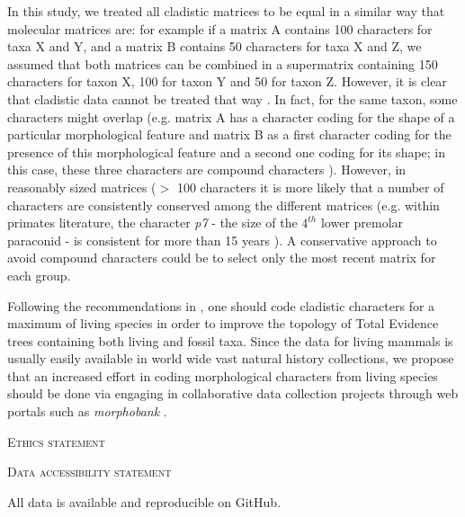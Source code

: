 \documentclass[12pt,letterpaper]{article}
\renewcommand{\section}[1]{%
\bigskip
\begin{center}
\begin{Large}
\normalfont\scshape #1
\medskip
\end{Large}
\end{center}}
\begin{document}
In this study, we treated all cladistic matrices to be equal in a similar way that molecular matrices are: for example if a matrix A contains 100 characters for taxa X and Y, and a matrix B contains 50 characters for taxa X and Z, we assumed that both matrices can be combined in a supermatrix containing 150 characters for taxon X, 100 for taxon Y and 50 for taxon Z.
However, it is clear that cladistic data cannot be treated that way \citep{Brazeau2011}.
In fact, for the same taxon, some characters might overlap (e.g. matrix A has a character coding for the shape of a particular morphological feature and matrix B as a first character coding for the presence of this morphological feature and a second one coding for its shape; in this case, these three characters are compound characters \citep{Brazeau2011}).
However, in reasonably sized matrices ($>$ 100 characters \citep{GuillermeCooper,harrisonamong-character2014} it is more likely that a number of characters are consistently conserved among the different matrices (e.g. within primates literature, the character \textit{p7} - the size of the $4^{th}$ lower premolar paraconid - is consistent for more than 15 years \citep{ross1998phylogenetic,seiffert2003fossil,marivaux2005anthropoid,seiffert2005basal,bloch2007new,kay2008anatomy,silcox2008biogeographic,seiffert2009convergent,tabuce2009anthropoid,boyer2010astragalar,seiffert2010fossil,marivaux2013djebelemur,ni2013oldest}).
A conservative approach to avoid compound characters could be to select only the most recent matrix for each group.

Following the recommendations in \citep{GuillermeCooper}, one should code cladistic characters for a maximum of living species in order to improve the topology of Total Evidence trees containing both living and fossil taxa.
Since the data for living mammals is usually easily available in world wide vast natural history collections, we propose that an increased effort in coding morphological characters from living species should be done via engaging in collaborative data collection projects through web portals such as \textit{morphobank} \citep{morphobank}.

\section{Ethics statement}
\section{Data accessibility statement}
All data is available and reproducible on GitHub.
\end{document}
